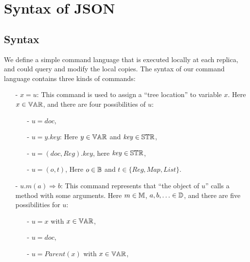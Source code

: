 
\section{Syntax of JSON}
\label{sec:syntax of json}


\subsection{Syntax}
\label{subsec:syntax}

We define a simple command language that is executed locally at each replica, and could query and modify the local copies. The syntax of our command language contains three kinds of commands: %

\begin{itemize}
\setlength{\itemsep}{0.5pt}
\item[-] $x = u$: This command is used to assign a ``tree location'' to variable $x$. Here $x \in \mathbb{VAR}$, and there are four possibilities of $u$:

    \begin{itemize}
    \setlength{\itemsep}{0.5pt}
    \item[-] $u = \mathit{doc}$,

    \item[-] $u = y.\mathit{key}$: Here $y \in \mathbb{VAR}$ and $\mathit{key} \in \mathbb{STR}$,

    \item[-] $u = (\mathit{doc},\mathit{Reg}).\mathit{key}$, here $\mathit{key} \in \mathbb{STR}$,

    \item[-] $u = (o,t)$, Here $o \in \mathbb{B}$ and $t \in \{ \mathit{Reg}, \mathit{Map},\mathit{List} \}$.
    \end{itemize}

\item[-] $u.m(a)\Rightarrow b$: This command represents that ``the object of $u$'' calls a method with some arguments. Here $m \in \mathbb{M}$, $a,b,\ldots \in \mathbb{D}$, and there are five possibilities for $u$:

    \begin{itemize}
    \setlength{\itemsep}{0.5pt}
    \item[-] $u = x$ with $x \in \mathbb{VAR}$,

    \item[-] $u = \mathit{doc}$,

    \item[-] $u = \mathit{Parent}(x)$ with $x \in \mathbb{VAR}$,


\end{itemize}
\end{itemize}
